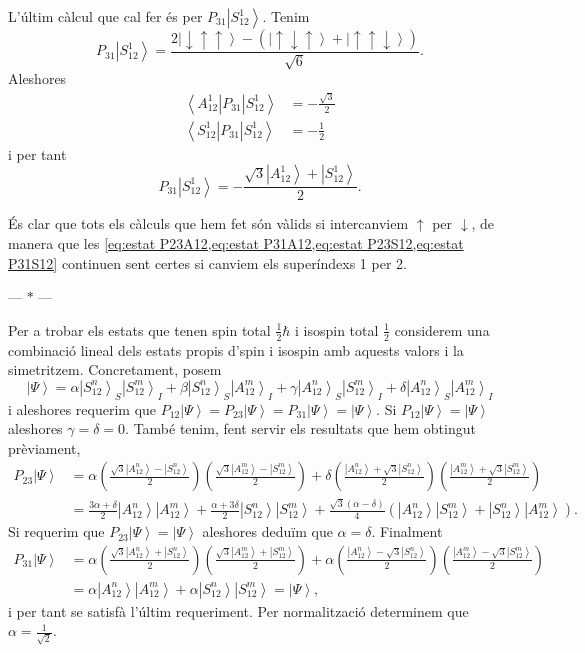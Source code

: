\documentclass[12pt]{article}
\numberwithin{table}{section}
\numberwithin{figure}{section}
\numberwithin{equation}{section}
\renewcommand{\up}{\uparrow}
\newcommand{\down}{\downarrow}
\newcommand{\ket}[1]{\left\vert {#1} \right\rangle}
\newcommand{\bra}[1]{\left\langle #1 \right\vert}
\newcommand{\parbreak}{
	\begin{center}
		--- $\ast$ ---
	\end{center} 
}
\begin{document}
L'últim càlcul que cal fer és per \( P_{31}\ket{S_{12}^1} \). Tenim
\begin{equation*}
	P_{31}\ket{S_{12}^1} = \frac{2\ket{\down\up\up} - (\ket{\up\down\up} + \ket{\up\up\down})}{\sqrt{6}}.
\end{equation*}
Aleshores
\begin{align*}
	\bra{A_{12}^1}P_{31}\ket{S_{12}^1} &= -\frac{\sqrt{3}}{2} \\
	\bra{S_{12}^1}P_{31}\ket{S_{12}^1} &= - \frac{1}{2}
\end{align*}
i per tant
\begin{equation}\label{eq:estat P31S12}
	P_{31}\ket{S_{12}^1} = - \frac{\sqrt{3}\ket{A_{12}^1} + \ket{S_{12}^1}}{2}.
\end{equation}

És clar que tots els càlculs que hem fet són vàlids si intercanviem \( \up \) per \( \down \), de manera que les \cref{eq:estat P23A12,eq:estat P31A12,eq:estat P23S12,eq:estat P31S12} continuen sent certes si canviem els superíndexs 1 per 2.

\parbreak

Per a trobar els estats que tenen spin total \( \frac{1}{2}\hbar \) i isospin total \( \frac{1}{2} \) considerem una combinació lineal dels estats propis d'spin i isospin amb aquests valors i la simetritzem. Concretament, posem
\begin{equation*}
	\ket{\Psi} = \alpha \ket{S_{12}^n}_S\ket{S_{12}^m}_I + \beta \ket{S_{12}^n}_S\ket{A_{12}^m}_I + \gamma \ket{A_{12}^n}_S\ket{S_{12}^m}_I + \delta \ket{A_{12}^n}_S\ket{A_{12}^m}_I
\end{equation*}
i aleshores requerim que \( P_{12}\ket{\Psi} = P_{23}\ket{\Psi} = P_{31}\ket{\Psi} = \ket{\Psi} \). Si \( P_{12}\ket{\Psi} = \ket{\Psi} \) aleshores \( \gamma = \delta = 0 \). També tenim, fent servir els resultats que hem obtingut prèviament,
\begin{align*}
	P_{23} \ket{\Psi} &= \alpha \left(\frac{\sqrt{3}\ket{A_{12}^n} - \ket{S_{12}^n}}{2}\right)\left(\frac{\sqrt{3}\ket{A_{12}^m} - \ket{S_{12}^m}}{2}\right) + \delta\left(\frac{\ket{A_{12}^n} + \sqrt{3}\ket{S_{12}^n}}{2}\right)\left(\frac{\ket{A_{12}^m} + \sqrt{3}\ket{S_{12}^m}}{2}\right) \\
										&= \frac{3\alpha + \delta}{2}\ket{A_{12}^n}\ket{A_{12}^m} + \frac{\alpha + 3\delta}{2}\ket{S_{12}^n}\ket{S_{12}^m} + \frac{\sqrt{3}(\alpha - \delta)}{4}(\ket{A_{12}^n}\ket{S_{12}^m} + \ket{S_{12}^n}\ket{A_{12}^m}).
\end{align*}
Si requerim que \( P_{23}\ket{\Psi} = \ket{\Psi} \) aleshores deduïm que \( \alpha = \delta \). Finalment
\begin{align*}
	P_{31} \ket{\Psi} &= \alpha \left(\frac{\sqrt{3}\ket{A_{12}^n} + \ket{S_{12}^n}}{2}\right)\left(\frac{\sqrt{3}\ket{A_{12}^m} + \ket{S_{12}^m}}{2}\right) + \alpha\left(\frac{\ket{A_{12}^n} - \sqrt{3}\ket{S_{12}^n}}{2}\right)\left(\frac{\ket{A_{12}^m} - \sqrt{3}\ket{S_{12}^m}}{2}\right) \\
										&= \alpha\ket{A_{12}^n}\ket{A_{12}^m} + \alpha\ket{S_{12}^n}\ket{S_{12}^m} = \ket{\Psi}, 
\end{align*}
i per tant se satisfà l'últim requeriment. Per normalització determinem que \( \alpha = \frac{1}{\sqrt{2}} \).
\end{document}
